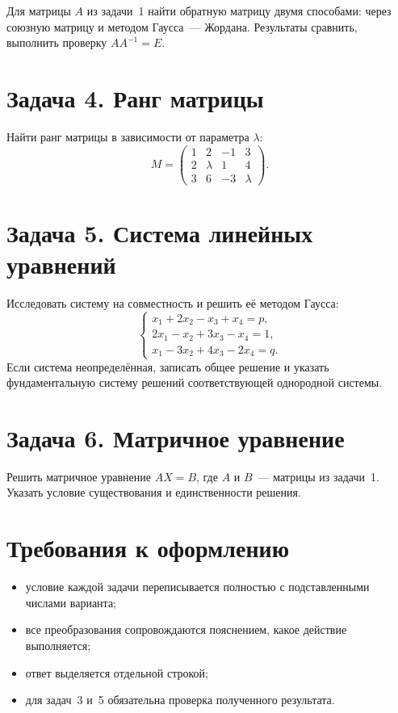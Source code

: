 \documentclass[12pt, a4paper]{article}
\begin{document}
Для матрицы $A$ из задачи~1 найти обратную матрицу двумя способами:
через союзную матрицу и методом Гаусса~--- Жордана. Результаты сравнить,
выполнить проверку $AA^{-1} = E$.

\section*{Задача 4. Ранг матрицы}

Найти ранг матрицы в зависимости от параметра $\lambda$:
\[
M = \begin{pmatrix}
1 & 2 & -1 & 3 \\
2 & \lambda & 1 & 4 \\
3 & 6 & -3 & \lambda
\end{pmatrix}.
\]

\section*{Задача 5. Система линейных уравнений}

Исследовать систему на совместность и решить её методом Гаусса:
\[
\begin{cases}
x_1 + 2x_2 - x_3 + x_4 = p, \\
2x_1 - x_2 + 3x_3 - x_4 = 1, \\
x_1 - 3x_2 + 4x_3 - 2x_4 = q.
\end{cases}
\]
Если система неопределённая, записать общее решение и указать фундаментальную
систему решений соответствующей однородной системы.

\section*{Задача 6. Матричное уравнение}

Решить матричное уравнение $AX = B$, где $A$ и $B$~--- матрицы из задачи~1.
Указать условие существования и единственности решения.

\vspace{1.2em}

\section*{Требования к оформлению}

\begin{itemize}[nosep]
  \item условие каждой задачи переписывается полностью с подставленными числами варианта;
  \item все преобразования сопровождаются пояснением, какое действие выполняется;
  \item ответ выделяется отдельной строкой;
  \item для задач~3 и~5 обязательна проверка полученного результата.
\end{itemize}
\end{document}
